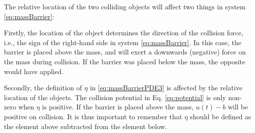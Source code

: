 The relative location of the two colliding objects will affect two things in system \eqref{eq:massBarrier}:

Firstly, the location of the object determines the direction of the collision force, i.e., the sign of the right-hand side in system \eqref{eq:massBarrier}. In this case, the barrier is placed above the mass, and will exert a downwards (negative) force on the mass during collision. If the barrier was placed below the mass, the opposite would have applied.

Secondly, the definition of $\eta$ in \eqref{eq:massBarrierPDE3} is affected by the relative location of the objects. The collision potential in Eq. \eqref{eq:potential} is only non-zero when $\eta$ is positive. If the barrier is placed above the mass, $u(t)-b$ will be positive on collision. It is thus important to remember that $\eta$ should be defined as the element above subtracted from the element below.

